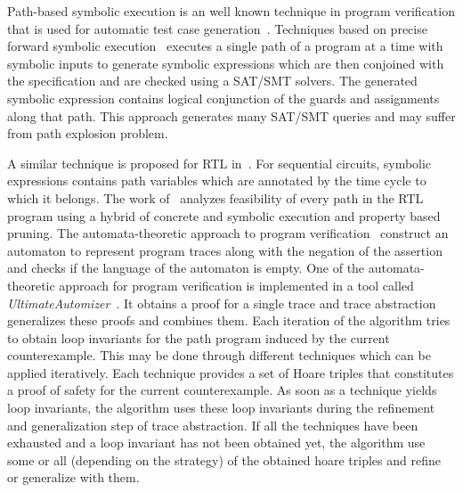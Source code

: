 %
Path-based symbolic execution is an well known technique in program verification 
that is used for automatic test case generation~\cite{DBLP:conf/osdi/CadarDE08}.
Techniques based on precise forward symbolic 
execution~\cite{DBLP:conf/osdi/CadarDE08, King:1976:SEP:360248.360252}
executes a single path of a program at a time with symbolic inputs 
to generate symbolic expressions which are then conjoined with
the specification and are checked using a SAT/SMT solvers. 
The generated symbolic expression contains logical conjunction 
of the guards and assignments along that path.  This approach generates many 
SAT/SMT queries and may suffer from path explosion problem.

A similar technique is proposed for RTL in~\cite{star}. 
For sequential circuits, symbolic expressions contains path variables which 
are annotated by the time cycle to which it belongs. The 
work of~\cite{DBLP:journals/todaes/LiuV14} analyzes 
feasibility of every path in the RTL program using a hybrid 
of concrete and symbolic execution and property based pruning.
%
%
The automata-theoretic approach to program verification~\cite{DBLP:conf/cav/HeizmannHP13} construct 
an automaton to represent program traces along with the negation of the assertion and checks if the 
language of the automaton is empty. One of the automata-theoretic approach for program verification 
is implemented in a tool called \emph{UltimateAutomizer}~\cite{DBLP:conf/tacas/HeizmannDGLMSP16}. 
It obtains a proof for a single trace and trace abstraction generalizes 
these proofs and combines them.  Each iteration of the 
algorithm tries to obtain loop invariants for the path program
induced by the current counterexample.  This may be done through different techniques 
which can be applied iteratively. Each technique provides a set of Hoare triples that constitutes a proof of
safety for the current counterexample.
As soon as a technique yields loop invariants, the algorithm uses these loop
invariants during the refinement and generalization step of trace abstraction.  If all the 
techniques have been exhausted and a loop invariant has not been obtained yet, the algorithm
use some or all (depending on the strategy) of the obtained hoare triples and 
refine or generalize with them.



